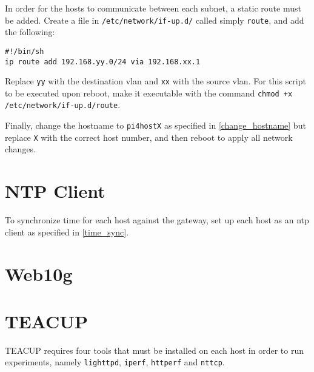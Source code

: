 In order for the hosts to communicate between each subnet, a static route must be added. Create a file in \lstinline{/etc/network/if-up.d/} called simply \lstinline{route}, and add the following:

\begin{verbatim}
#!/bin/sh
ip route add 192.168.yy.0/24 via 192.168.xx.1
\end{verbatim}

Replace \lstinline{yy} with the destination \gls{vlan} and \lstinline{xx} with the source \gls{vlan}. For this script to be executed upon reboot, make it executable with the command \lstinline{chmod +x /etc/network/if-up.d/route}.

Finally, change the hostname to \lstinline{pi4hostX} as specified in \ref{change_hostname} but replace \lstinline{X} with the correct host number, and then reboot to apply all network changes.


\section{NTP Client}

To synchronize time for each host against the gateway, set up each host as an \gls{ntp} client as specified in \ref{time_sync}.

\section{Web10g}



\section{TEACUP}

TEACUP requires four tools that must be installed on each host in order to run experiments, namely \lstinline{lighttpd},  \lstinline{iperf}, \lstinline{httperf} and \lstinline{nttcp}. 